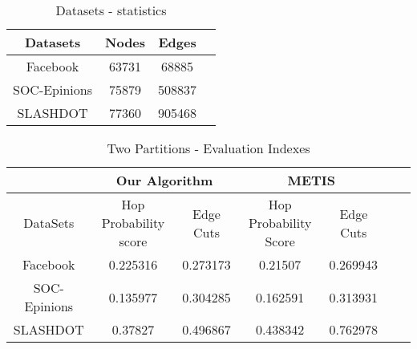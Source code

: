 \documentclass[letterpaper]{article}
\begin{document}
\begin{table*}[htb]
\centering
\caption{Datasets - statistics}
\begin{tabular}{|c|c|c|c|}
\hline
 Datasets& Nodes & Edges \\
\hline
Facebook& 63731 & 68885  \\
\hline
SOC-Epinions & 75879 & 508837   \\
\hline
SLASHDOT& 77360 & 905468  \\
\hline
\end{tabular}

\label{fig:twopartcuts}
\end{table*}
\begin{table*}[htb]
\centering
\caption{Two Partitions - Evaluation Indexes}
\begin{tabular}{|c|c|c|c|c|c|c|}
\hline
 &\multicolumn{2}{c|}{Our Algorithm}&\multicolumn{2}{c|}{METIS}\\
\hline
 DataSets&Hop Probability score &Edge Cuts&Hop Probability Score&Edge Cuts\\
\hline
Facebook& 0.225316 & 0.273173  & 0.21507 & 0.269943\\
\hline
SOC-Epinions & 0.135977 & 0.304285  & 0.162591 & 0.313931\\
\hline
SLASHDOT& 0.37827 & 0.496867  & 0.438342 & 0.762978\\
\hline
\end{tabular}
\label{fig:twopartindex}
\end{table*}
\end{document}

